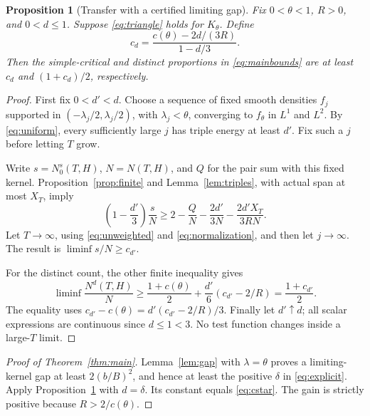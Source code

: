 \documentclass[11pt]{article}
\newtheorem{proposition}[theorem]{Proposition}
\theoremstyle{remark}
\begin{document}
\begin{proposition}[Transfer with a certified limiting gap]\label{prop:transfer}
Fix $0<\theta<1$, $R>0$, and $0<d\le1$. Suppose \eqref{eq:triangle}
holds for $K_\theta$. Define
\[
 c_d=\frac{c(\theta)-2d/(3R)}{1-d/3}.
\]
Then the simple-critical and distinct proportions in \eqref{eq:mainbounds}
are at least $c_d$ and $(1+c_d)/2$, respectively.
\end{proposition}
\begin{proof}
First fix $0<d'<d$. Choose a sequence of fixed smooth densities $f_j$
supported in $(-\lambda_j/2,\lambda_j/2)$, with
$\lambda_j<\theta$, converging to $f_\theta$ in $L^1$ and $L^2$.
By \eqref{eq:uniform}, every sufficiently large $j$ has triple energy
at least $d'$. Fix such a $j$ before letting $T$ grow.

Write $s=N_0^s(T,H)$, $N=N(T,H)$, and $Q$ for the pair sum with this
fixed kernel. Proposition~\ref{prop:finite} and Lemma~\ref{lem:triples},
with actual span at most $X_T$, imply
\[
 \left(1-\frac{d'}3\right)\frac sN
 \ge2-\frac QN-\frac{2d'}{3N}-\frac{2d'X_T}{3RN}.
\]
Let $T\to\infty$, using \eqref{eq:unweighted} and
\eqref{eq:normalization}, and then let $j\to\infty$. The result is
$\liminf s/N\ge c_{d'}$.

For the distinct count, the other finite inequality gives
\[
 \liminf\frac{N^d(T,H)}N
 \ge\frac{1+c(\theta)}2+\frac{d'}6(c_{d'}-2/R)
 =\frac{1+c_{d'}}2.
\]
The equality uses $c_{d'}-c(\theta)=d'(c_{d'}-2/R)/3$.
Finally let $d'\uparrow d$; all scalar expressions are continuous since
$d\le1<3$. No test function changes inside a large-$T$ limit.
\end{proof}

\begin{proof}[Proof of Theorem~\ref{thm:main}]
Lemma~\ref{lem:gap} with $\lambda=\theta$ proves a limiting-kernel gap
at least $2(b/B)^2$, and hence at least the positive $\delta$ in
\eqref{eq:explicit}. Apply Proposition~\ref{prop:transfer} with
$d=\delta$. Its constant equals \eqref{eq:cstar}. The gain is strictly
positive because $R>2/c(\theta)$.
\end{proof}
\end{document}
